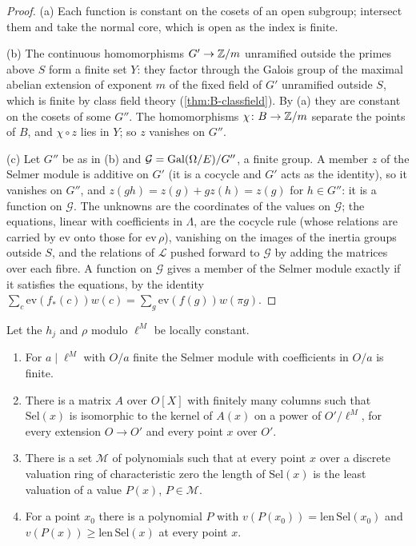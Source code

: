 \begin{proof}
(a) Each function is constant on the cosets of an open subgroup; intersect them and take the normal core, which is open as the index is finite.

(b) The continuous homomorphisms $G'\to\mathbb{Z}/m$ unramified outside the primes above $S$ form a finite set $Y$: they factor through the Galois group of the maximal abelian extension of exponent $m$ of the fixed field of $G'$ unramified outside $S$, which is finite by class field theory (\cref{thm:B-classfield}). By (a) they are constant on
the cosets of some $G''$. The homomorphisms $\chi\colon B\to\mathbb{Z}/m$ separate the points of $B$, and $\chi\circ z$ lies in $Y$; so $z$ vanishes on $G''$.

(c) Let $G''$ be as in (b) and $\mathcal G=\operatorname{Gal}(\Omega/E)/G''$, a finite group. A member $z$ of the Selmer module is additive on $G'$ (it is a cocycle and $G'$ acts as the identity), so it vanishes on $G''$, and $z(gh)=z(g)+gz(h)=z(g)$ for $h\in G''$: it is a function on $\mathcal G$. The unknowns are the coordinates of the values on $\mathcal G$; the equations, linear
with coefficients in $\Lambda$, are the cocycle rule (whose relations are carried by $\mathrm{ev}$ onto those for $\mathrm{ev}\,\rho$), vanishing on the images of the inertia groups outside $S$, and the relations of $\mathcal L$ pushed forward to $\mathcal G$ by adding the matrices over each fibre. A function on $\mathcal G$ gives a member of the
Selmer module exactly if it satisfies the equations, by the identity $\sum_c\mathrm{ev}(f_*(c))w(c)=\sum_g\mathrm{ev}(f(g))w(\pi g)$.
\end{proof}

\begin{proposition}\label{prop:one-system}
Let the $h_j$ and $\rho$ modulo $\ell^M$ be locally constant.
\begin{enumerate}[label=\textup{(\alph*)}]
\item For $a\mid\ell^M$ with $O/a$ finite the Selmer module with coefficients in $O/a$ is finite.
\item There is a matrix $A$ over $O[X]$ with finitely many columns such that $\mathrm{Sel}(x)$ is isomorphic to the kernel of $A(x)$ on a power of $O'/\ell^M$, for every extension $O\to O'$ and every point $x$ over $O'$.
\item There is a set $\mathcal M$ of polynomials such that at every point $x$ over a discrete valuation ring of characteristic zero the length of $\mathrm{Sel}(x)$ is the least valuation of a value $P(x)$, $P\in\mathcal M$.
\item For a point $x_0$ there is a polynomial $P$ with $v(P(x_0))=\mathrm{len}\,\mathrm{Sel}(x_0)$ and $v(P(x))\ge\mathrm{len}\,\mathrm{Sel}(x)$ at every point $x$.
\end{enumerate}
\end{proposition}

